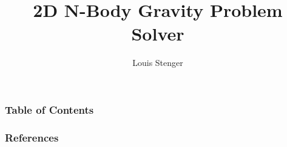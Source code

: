 \documentclass[11pt]{beamer}
\begin{document}
	\author{Louis Stenger}
	\title{2D N-Body Gravity Problem Solver}
	\date{}
	\begin{frame}[plain]
		\maketitle
	\end{frame}
	
	\begin{frame}
		\frametitle{Table of Contents}
		\tableofcontents
	\end{frame}
	
	
	
	
	
	\begin{frame}[t,allowframebreaks]
		\frametitle{References}
		\printbibliography
	\end{frame}
\end{document}
